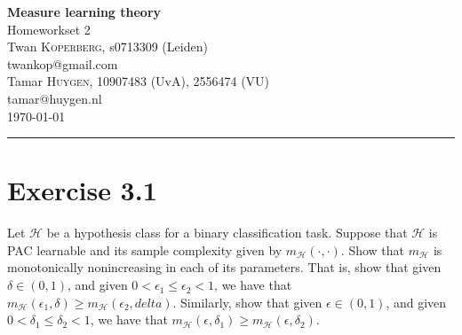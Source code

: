 \documentclass[10pt, a4paper, twoside]{amsart}
\makeatletter
\newcommand{\firstName}  {Twan}
\newcommand{\lastName}   {Koperberg}
\newcommand{\studId}     {0713309 (Leiden)}
\renewcommand{\email}    {twankop@gmail.com}
\newcommand{\firstNameII}  {Tamar}
\newcommand{\lastNameII}   {Huygen}
\newcommand{\studIdII}     {10907483 (UvA)}
\newcommand{\studIdIII}    {2556474 (VU)}
\newcommand{\emailII}     {tamar@huygen.nl}
\makeatother
\begin{document}
\begin{center}
  {\huge\bf Measure learning theory}\\
  {\large\sc Homeworkset 2 }\\ \vspace{1em}
  \firstName \textsc{ \lastName}, {\sc s}\studId \\
  \email\text{}\\ \smallskip
  \firstNameII \textsc{ \lastNameII}, \studIdII, \studIdIII\\
  \emailII \\ \bigskip
  \today \\\bigskip
  \hrule
  \bigskip
\end{center}

\section*{Exercise 3.1}
Let $\mathcal{H}$ be a hypothesis class for a binary classification task. Suppose that $\mathcal{H}$ is PAC learnable and its sample complexity given by $m_{\mathcal{H}}(\cdot,\cdot)$.
Show that $m_{\mathcal{H}}$ is monotonically nonincreasing in each of its parameters. That is, show that given $\delta \in (0,1)$, and given $0<\epsilon_1 \leq \epsilon_2<1$, we have that $m_{\mathcal{H}}(\epsilon_1, \delta) \geq m_{\mathcal{H}}(\epsilon_2, delta)$. Similarly, show that given $\epsilon \in (0,1)$, and given $0<\delta_1 \leq \delta_2 <1$, we have that $m_{\mathcal{H}}(\epsilon, \delta_1) \geq m_{\mathcal{H}}(\epsilon, \delta_2)$.
\end{document}
